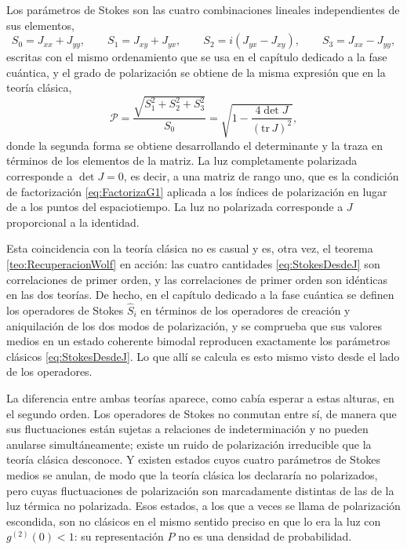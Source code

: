     Los parámetros de Stokes son las cuatro combinaciones lineales independientes de sus elementos,
    \begin{equation}\label{eq:StokesDesdeJ}
        S_{0} = J_{xx}+J_{yy},
        \qquad
        S_{1} = J_{xy}+J_{yx},
        \qquad
        S_{2} = i\left(J_{yx}-J_{xy}\right),
        \qquad
        S_{3} = J_{xx}-J_{yy},
    \end{equation}
    escritas con el mismo ordenamiento que se usa en el capítulo dedicado a la fase cuántica, y el grado de polarización se obtiene de la misma expresión que en la teoría clásica,
    \begin{equation}\label{eq:GradoPolarizacion}
        \mathcal{P} = \frac{\sqrt{S_{1}^{2}+S_{2}^{2}+S_{3}^{2}}}{S_{0}} = \sqrt{1 - \frac{4\det J}{\left(\mathrm{tr}\,J\right)^{2}}},
    \end{equation}
    donde la segunda forma se obtiene desarrollando el determinante y la traza en términos de los elementos de la matriz. La luz completamente polarizada corresponde a $\det J = 0$, es decir, a una matriz de rango uno, que es la condición de factorización \eqref{eq:FactorizaG1} aplicada a los índices de polarización en lugar de a los puntos del espaciotiempo. La luz no polarizada corresponde a $J$ proporcional a la identidad.

    Esta coincidencia con la teoría clásica no es casual y es, otra vez, el teorema \ref{teo:RecuperacionWolf} en acción: las cuatro cantidades \eqref{eq:StokesDesdeJ} son correlaciones de primer orden, y las correlaciones de primer orden son idénticas en las dos teorías. De hecho, en el capítulo dedicado a la fase cuántica se definen los operadores de Stokes $\hat{S}_{i}$ en términos de los operadores de creación y aniquilación de los dos modos de polarización, y se comprueba que sus valores medios en un estado coherente bimodal reproducen exactamente los parámetros clásicos \eqref{eq:StokesDesdeJ}. Lo que allí se calcula es esto mismo visto desde el lado de los operadores.

    La diferencia entre ambas teorías aparece, como cabía esperar a estas alturas, en el segundo orden. Los operadores de Stokes no conmutan entre sí, de manera que sus fluctuaciones están sujetas a relaciones de indeterminación y no pueden anularse simultáneamente; existe un ruido de polarización irreducible que la teoría clásica desconoce. Y existen estados cuyos cuatro parámetros de Stokes medios se anulan, de modo que la teoría clásica los declararía no polarizados, pero cuyas fluctuaciones de polarización son marcadamente distintas de las de la luz térmica no polarizada. Esos estados, a los que a veces se llama de polarización escondida, son no clásicos en el mismo sentido preciso en que lo era la luz con $g^{(2)}(0)<1$: su representación $P$ no es una densidad de probabilidad.

